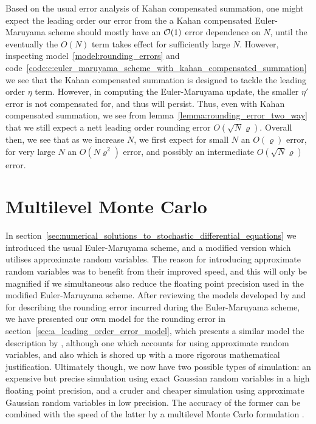 \documentclass[manuscript,review]{acmart}
\begin{document}
Based on the usual error analysis of Kahan compensated summation, one might expect the leading order our error from the a Kahan compensated Euler-Maruyama scheme should mostly have an $ \order{1} $ error dependence on $ N $, until the eventually the $ O(N) $ term takes effect for sufficiently large $ N $. However, inspecting model~\ref{model:rounding_errors} and code~\ref{code:c:euler_maruyama_scheme_with_kahan_compensated_summation} we see that the Kahan compensated summation is designed to tackle the leading order $ \eta $ term. However, in computing the Euler-Maruyama update, the smaller $ \eta' $ error is not compensated for, and thus will persist. Thus, even with Kahan compensated summation, we see from lemma~\ref{lemma:rounding_error_two_way} that we still expect a nett leading order rounding error $ O(\sqrt{N}\varrho) $. Overall then, we see that as we increase $ N $, we first expect for small $ N $ an $ O(\varrho) $ error, for very large $ N $ an $ O(N\varrho^2) $ error, and possibly an intermediate $ O(\sqrt{N}\varrho) $ error. 


\section{Multilevel Monte Carlo}
\label{sec:multilevel_monte_carlo}

In section~\ref{sec:numerical_solutions_to_stochastic_differential_equations} we introduced the usual Euler-Maruyama scheme, and a modified version which utilises approximate random variables. The reason for introducing approximate random variables was to benefit from their improved speed, and this will only be magnified if we simultaneous also reduce the floating point precision used in the modified Euler-Maruyama scheme. After reviewing the models developed by \citet{arciniega2003rounding} and \citet{omland2016mixed} for describing the rounding error incurred during the Euler-Maruyama scheme, we have presented our own model for the rounding error in section~\ref{sec:a_leading_order_error_model}, which presents a similar model the description by \citet{arciniega2003rounding}, although one which accounts for using approximate random variables, and also which is shored up with a more rigorous mathematical justification. Ultimately though, we now have two possible types of simulation: an expensive but precise simulation using exact Gaussian random variables in a high floating point precision, and a cruder and cheaper simulation using approximate Gaussian random variables in low precision. The accuracy of the former can be combined with the speed of the latter by a multilevel Monte Carlo formulation \citep{giles2008multilevel,giles2015multilevel_review}. 
\end{document}
